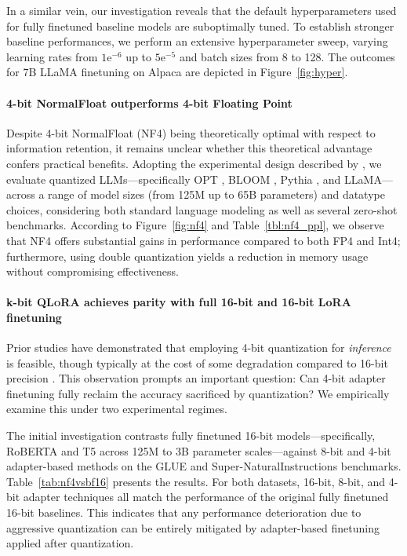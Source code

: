 In a similar vein, our investigation reveals that the default hyperparameters used for fully finetuned baseline models are suboptimally tuned. To establish stronger baseline performances, we perform an extensive hyperparameter sweep, varying learning rates from $1\text{e}^{-6}$ up to $5\text{e}^{-5}$ and batch sizes from 8 to 128. The outcomes for 7B LLaMA finetuning on Alpaca are depicted in Figure~\ref{fig:hyper}.

\paragraph{4-bit NormalFloat outperforms 4-bit Floating Point}

Despite 4-bit NormalFloat (NF4) being theoretically optimal with respect to information retention, it remains unclear whether this theoretical advantage confers practical benefits. Adopting the experimental design described by \citet{dettmers2022case}, we evaluate quantized LLMs—specifically OPT \citep{zhang2022opt}, BLOOM \cite{scao2022bloom}, Pythia \cite{biderman2023pythia}, and LLaMA—across a range of model sizes (from 125M up to 65B parameters) and datatype choices, considering both standard language modeling as well as several zero-shot benchmarks. According to Figure~\ref{fig:nf4} and Table~\ref{tbl:nf4_ppl}, we observe that NF4 offers substantial gains in performance compared to both FP4 and Int4; furthermore, using double quantization yields a reduction in memory usage without compromising effectiveness.

\paragraph{k-bit \textsc{QLoRA} achieves parity with full 16-bit and 16-bit LoRA finetuning} 

Prior studies have demonstrated that employing 4-bit quantization for \emph{inference} is feasible, though typically at the cost of some degradation compared to 16-bit precision \citep{dettmers2022case,frantar2022gptq}. This observation prompts an important question: Can 4-bit adapter finetuning fully reclaim the accuracy sacrificed by quantization? We empirically examine this under two experimental regimes.

The initial investigation contrasts fully finetuned 16-bit models—specifically, RoBERTA and T5 across 125M to 3B parameter scales—against 8-bit and 4-bit adapter-based methods on the GLUE and Super-NaturalInstructions benchmarks. Table~\ref{tab:nf4vsbf16} presents the results. For both datasets, 16-bit, 8-bit, and 4-bit adapter techniques all match the performance of the original fully finetuned 16-bit baselines. This indicates that any performance deterioration due to aggressive quantization can be entirely mitigated by adapter-based finetuning applied after quantization.

